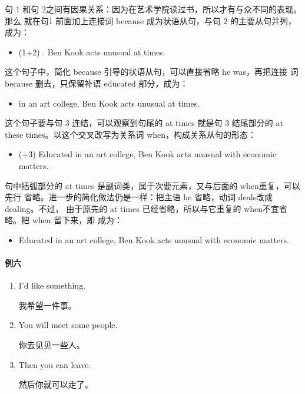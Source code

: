 句 1 和句 2之间有因果关系：因为在艺术学院读过书，所以才有与众不同的表现。那么
就在句1 前面加上连接词 because 成为状语从句，与句 2 的主要从句并列，成为：
\begin{itemize}
\item (1+2) . Ben Kook acts unusual at
  times.
\end{itemize}
这个句子中，简化 because 引导的状语从句，可以直接省略 he was，再把连接
词because 删去，只保留补语 educated 部分，成为：
\begin{itemize}
\item {} in an art college, Ben Kook acts unusual at times.
\end{itemize}
这个句子要与句 3 连结，可以观察到句尾的 at times 就是句 3 结尾部分的 at
these times。以这个交叉改写为关系词 when，构成关系从句的形态：
\begin{itemize}
\item (+3) Educated in an art college, Ben Kook acts unusual  with economic matters.
\end{itemize}
句中括弧部分的 at times 是副词类，属于次要元素，又与后面的 when重复，可以先行
省略。进一步的简化做法仍是一样：把主语 he 省略，动词 deals改成 dealing。不过，
由于原先的 at times 已经省略，所以与它重复的 when不宜省略。把 when 留下来，即
成为：

\begin{itemize}
\item Educated in an art college, Ben Kook acts unusual  with
  economic matters.
\end{itemize}

\paragraph{例六}

\begin{enumerate}
\item   I'd like something.

  我希望一件事。
\item   You will meet some people.

  你去见见一些人。
\item   Then you can leave.

  然后你就可以走了。
\end{enumerate}

